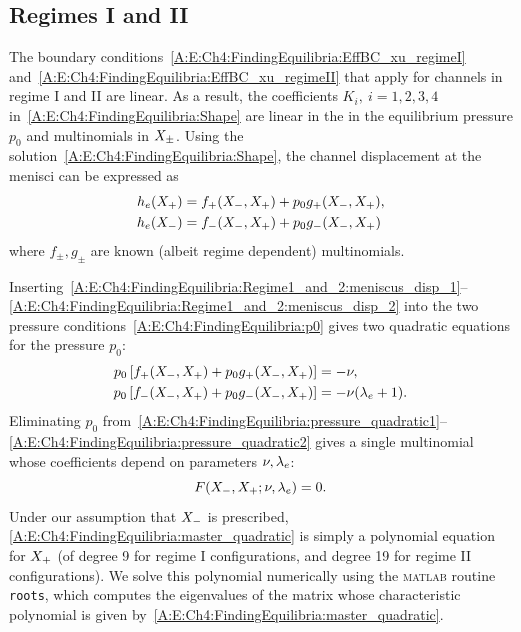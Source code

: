 \begin{subappendices}
\subsection{Regimes I and II}
The boundary conditions~\eqref{A:E:Ch4:FindingEquilibria:EffBC_xu_regimeI} and~\eqref{A:E:Ch4:FindingEquilibria:EffBC_xu_regimeII} that apply for channels in regime I and II are linear. As a result, the coefficients $K_i, ~i = 1,2,3,4$ in~\eqref{A:E:Ch4:FindingEquilibria:Shape} are linear in the in the equilibrium pressure $p_0$ and multinomials in $X_{\pm}$. Using the solution~\eqref{A:E:Ch4:FindingEquilibria:Shape},  the channel displacement at the menisci can be expressed as
\begin{align}
h_e(X_{+}) &= f_+(X_{-}, X_{+}) + p_0 g_+(X_{-}, X_{+}), \label{A:E:Ch4:FindingEquilibria:Regime1_and_2:meniscus_disp_1}\\
h_e(X_{-}) &= f_-(X_{-}, X_{+}) + p_0 g_-(X_{-}, X_{+})\label{A:E:Ch4:FindingEquilibria:Regime1_and_2:meniscus_disp_2}
\end{align}
where $f_{\pm}, g_{\pm}$ are known (albeit regime dependent) multinomials.

Inserting~\eqref{A:E:Ch4:FindingEquilibria:Regime1_and_2:meniscus_disp_1}--\eqref{A:E:Ch4:FindingEquilibria:Regime1_and_2:meniscus_disp_2} into the two pressure conditions~\eqref{A:E:Ch4:FindingEquilibria:p0} gives two quadratic equations for the pressure $p_0$:
\begin{align}
p_0 \left[f_+(X_{-}, X_{+}) + p_0 g_+(X_{-}, X_{+})\right]  &= -\nu, \label{A:E:Ch4:FindingEquilibria:pressure_quadratic1}\\
 p_0 \left[f_-(X_{-}, X_{+}) + p_0 g_-(X_{-}, X_{+})\right]  &= -\nu ( \lambda_e+1).\label{A:E:Ch4:FindingEquilibria:pressure_quadratic2}
\end{align}
Eliminating $p_0$ from~\eqref{A:E:Ch4:FindingEquilibria:pressure_quadratic1}--\eqref{A:E:Ch4:FindingEquilibria:pressure_quadratic2} gives a single multinomial whose coefficients depend on parameters $\nu, \lambda_e$:
\begin{equation}\label{A:E:Ch4:FindingEquilibria:master_quadratic}
F(X_{-}, X_{+};\nu, \lambda_e) = 0.
\end{equation}
Under our assumption that $X_{-}$ is prescribed, \eqref{A:E:Ch4:FindingEquilibria:master_quadratic} is simply a polynomial equation for $X_{+}$ (of degree 9 for regime I configurations, and degree 19 for regime II configurations). We solve this polynomial numerically using the \textsc{matlab} routine \texttt{roots}, which computes the eigenvalues of the matrix whose characteristic polynomial is given by~\eqref{A:E:Ch4:FindingEquilibria:master_quadratic}.


\end{subappendices}
